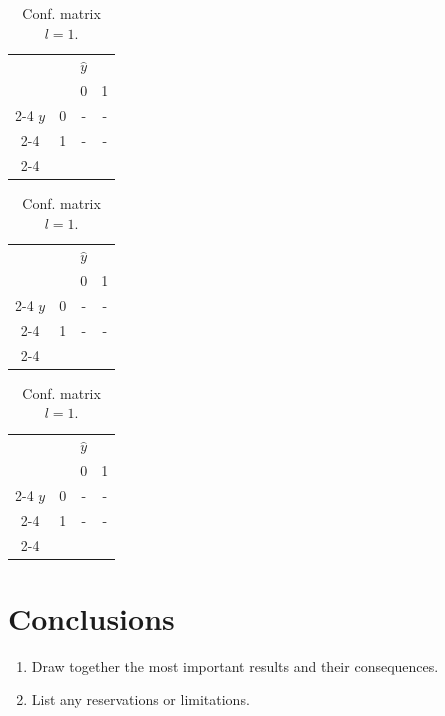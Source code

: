 \documentclass[english]{article}
\providecommand{\tabularnewline}{\\}
\begin{document}
\begin{table}
\centering{}%
\begin{minipage}[t]{0.33\textwidth}%
\begin{center}
\begin{tabular}{cc|c|c}
 & \multicolumn{1}{c}{} & \multicolumn{1}{c}{$\hat{y}$} & \tabularnewline
 &  & 0 & 1\tabularnewline
\cline{2-4} 
$y$ & 0 & - & -\tabularnewline
\cline{2-4} 
 & 1 & - & -\tabularnewline
\cline{2-4} 
\end{tabular} 
\par\end{center}
\caption{Conf. matrix $l=0.01$.\label{tab:conf_l_001}}
%
\end{minipage}%
\begin{minipage}[t]{0.33\textwidth}%
\begin{center}
\begin{tabular}{cc|c|c}
 & \multicolumn{1}{c}{} & \multicolumn{1}{c}{$\hat{y}$} & \tabularnewline
 &  & 0 & 1\tabularnewline
\cline{2-4} 
$y$ & 0 & - & -\tabularnewline
\cline{2-4} 
 & 1 & - & -\tabularnewline
\cline{2-4} 
\end{tabular} 
\par\end{center}
\caption{Conf. matrix $l=0.1$.\label{tab:conf_l_01}}
%
\end{minipage}%
\begin{minipage}[t]{0.33\textwidth}%
\begin{center}
\begin{tabular}{cc|c|c}
 & \multicolumn{1}{c}{} & \multicolumn{1}{c}{$\hat{y}$} & \tabularnewline
 &  & 0 & 1\tabularnewline
\cline{2-4} 
$y$ & 0 & - & -\tabularnewline
\cline{2-4} 
 & 1 & - & -\tabularnewline
\cline{2-4} 
\end{tabular} 
\par\end{center}
\caption{Conf. matrix $l=1$.\label{tab:conf_l_1}}
%
\end{minipage}
\end{table}


\section{Conclusions}
\begin{enumerate}
\item Draw together the most important results and their consequences.
\item List any reservations or limitations.
\end{enumerate}
\end{document}

